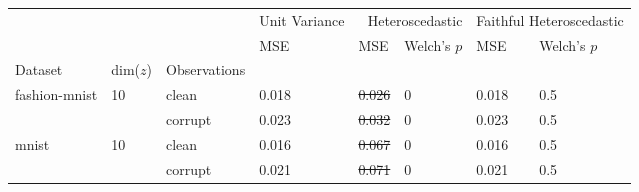 \begin{tabular}{lll|l|ll|ll}
\toprule
 &  &  & Unit Variance & \multicolumn{2}{r}{Heteroscedastic} & \multicolumn{2}{r}{Faithful Heteroscedastic} \\
 &  &  & MSE & MSE & Welch's $p$ & MSE & Welch's $p$ \\
Dataset & dim($z$) & Observations &  &  &  &  &  \\
\midrule
\multirow[c]{2}{*}{fashion-mnist} & \multirow[c]{2}{*}{10} & clean & 0.018 & \sout{0.026} & 0 & 0.018 & 0.5 \\
 &  & corrupt & 0.023 & \sout{0.032} & 0 & 0.023 & 0.5 \\
\multirow[c]{2}{*}{mnist} & \multirow[c]{2}{*}{10} & clean & 0.016 & \sout{0.067} & 0 & 0.016 & 0.5 \\
 &  & corrupt & 0.021 & \sout{0.071} & 0 & 0.021 & 0.5 \\
\bottomrule
\end{tabular}
